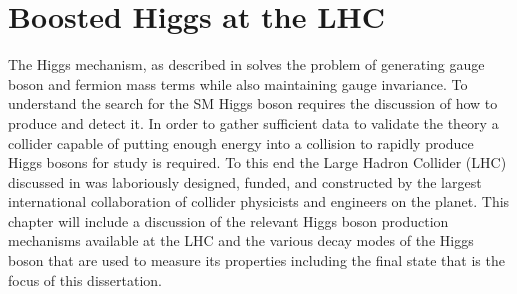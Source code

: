 \chapter{Boosted Higgs at the LHC} \label{chap:higgs}

The Higgs mechanism, as described in  solves the problem
of generating gauge boson and fermion mass terms while also maintaining gauge
invariance.  To understand the search for the SM Higgs boson requires the
discussion of how to produce and detect it.  In order to gather sufficient data
to validate the theory a collider capable of putting enough energy into a
collision to rapidly produce Higgs bosons for study is required.  To this end
the Large Hadron Collider (LHC) discussed in  was laboriously
designed, funded, and constructed by the largest international collaboration of
collider physicists and engineers on the planet. This chapter will include a
discussion of the relevant Higgs boson production mechanisms available at the
LHC and the various decay modes of the Higgs boson that are used to measure its
properties including the final state that is the focus of this dissertation.






